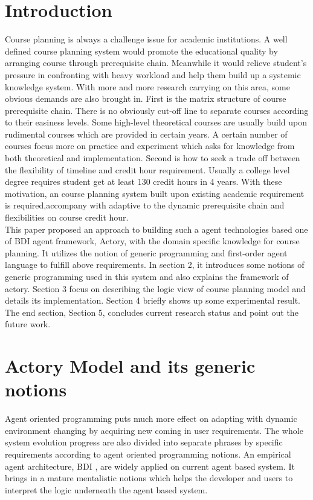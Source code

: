 \documentclass{sig-alternate}
\begin{document}
\section{Introduction}
Course planning is always a challenge issue for academic institutions.  A well defined course planning system would promote the educational quality by arranging course through prerequisite chain. Meanwhile it would relieve student's pressure in confronting with heavy workload and help them build up a systemic knowledge system.  With more and more research carrying on this area, some obvious demands are also brought in. First is the matrix structure of course prerequisite chain.  There is no obviously cut-off line to separate courses according to their easiness levels.  Some high-level theoretical courses are usually build upon rudimental courses which are provided in certain years. A certain number of courses focus more on practice and experiment which asks for  knowledge from both theoretical and implementation.  Second is how to seek a trade off between the flexibility of timeline and credit hour requirement.  Usually a college level degree requires student get at least 130 credit hours in 4 years.  With these motivation, an course planning system built upon existing academic requirement is required,accompany with adaptive to the dynamic prerequisite chain and flexibilities on course credit hour. \\

This paper proposed an approach to building such a agent technologies based one of BDI agent framework, Actory,  with the domain specific knowledge for course planning.   It utilizes the notion of generic programming and first-order agent language to fulfill above requirements. In section 2,  it introduces some notions of generic programming used in this system and also explains the framework of actory. Section 3 focus on describing the logic view of course planning model and details its implementation. Section 4 briefly shows up some experimental result.  The end section, Section 5, concludes current research status and point out the future work. \\

\section{Actory Model and its generic notions}
Agent oriented programming puts much more effect on adapting with dynamic environment changing by acquiring new coming in user requirements\cite{bresciani04}.   The whole system evolution progress  are also divided into separate phrases by specific requirements  according to agent oriented programming notions.  An empirical agent architecture, BDI\cite{rao1991mra} , are widely applied on current agent based system.  It brings in a mature mentalistic notions which helps the developer and users to interpret the logic underneath the agent based system.\\
\end{document}

